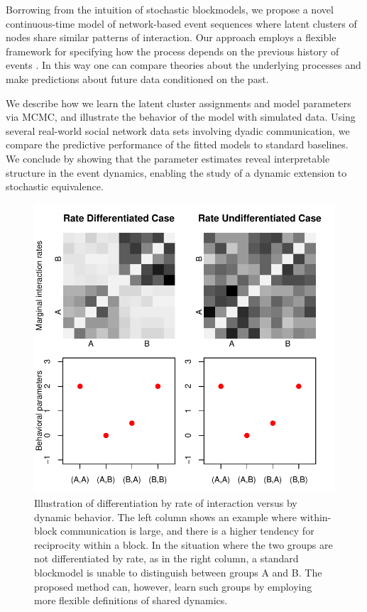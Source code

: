 %

Borrowing from the intuition of stochastic blockmodels, we propose a novel continuous-time model of network-based event sequences where latent clusters of nodes share similar patterns of interaction.
Our approach employs a flexible framework for  specifying how the process depends on the previous history of events \cite{AalenOddO.2008, Butts2008}.
In this way one can compare theories about the underlying processes and make predictions about future data conditioned on the past.

We describe how we learn the latent cluster assignments and model parameters via MCMC, and illustrate the behavior of the model with simulated data.
Using several real-world social network data sets involving dyadic communication, we compare the predictive performance of the fitted models to standard baselines.
We conclude by showing that the parameter estimates reveal interpretable structure in the event dynamics, enabling the study of a dynamic extension to stochastic equivalence.

\begin{figure}
\centering
\includegraphics[scale=.45]{../figs/introexample/all}
\caption{Illustration of differentiation by rate of interaction versus by dynamic behavior.  The left column shows an example where within-block communication is large, and there is a higher tendency for reciprocity within a block.  In the situation where the two groups are not differentiated by rate, as in the right column, a standard blockmodel is unable to distinguish between groups A and B.  The proposed method can, however, learn such groups by employing more flexible definitions of shared dynamics.}
\label{fig:introexample}
\end{figure}
